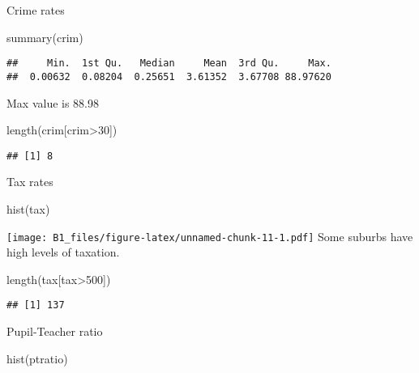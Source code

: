\documentclass[
]{article}
\newenvironment{Shaded}{\begin{snugshade}}{\end{snugshade}}
\newcommand{\DecValTok}[1]{\textcolor[rgb]{0.00,0.00,0.81}{#1}}
\newcommand{\FunctionTok}[1]{\textcolor[rgb]{0.00,0.00,0.00}{#1}}
\newcommand{\NormalTok}[1]{#1}
\newcommand{\SpecialCharTok}[1]{\textcolor[rgb]{0.00,0.00,0.00}{#1}}
\begin{document}
Crime rates

\begin{Shaded}
\begin{Highlighting}[]
\FunctionTok{summary}\NormalTok{(crim)}
\end{Highlighting}
\end{Shaded}

\begin{verbatim}
##     Min.  1st Qu.   Median     Mean  3rd Qu.     Max. 
##  0.00632  0.08204  0.25651  3.61352  3.67708 88.97620
\end{verbatim}

Max value is 88.98

\begin{Shaded}
\begin{Highlighting}[]
\FunctionTok{length}\NormalTok{(crim[crim}\SpecialCharTok{\textgreater{}}\DecValTok{30}\NormalTok{])}
\end{Highlighting}
\end{Shaded}

\begin{verbatim}
## [1] 8
\end{verbatim}

Tax rates

\begin{Shaded}
\begin{Highlighting}[]
\FunctionTok{hist}\NormalTok{(tax)}
\end{Highlighting}
\end{Shaded}

\texttt{[image: B1\_files/figure-latex/unnamed-chunk-11-1.pdf]} Some
suburbs have high levels of taxation.

\begin{Shaded}
\begin{Highlighting}[]
\FunctionTok{length}\NormalTok{(tax[tax}\SpecialCharTok{\textgreater{}}\DecValTok{500}\NormalTok{])}
\end{Highlighting}
\end{Shaded}

\begin{verbatim}
## [1] 137
\end{verbatim}

Pupil-Teacher ratio

\begin{Shaded}
\begin{Highlighting}[]
\FunctionTok{hist}\NormalTok{(ptratio)}
\end{Highlighting}
\end{Shaded}
\end{document}

